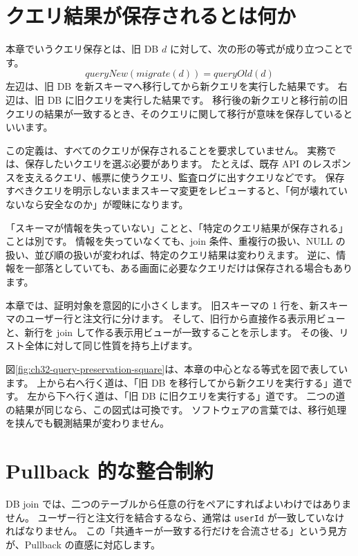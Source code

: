 \section{クエリ結果が保存されるとは何か}

本章でいうクエリ保存とは、旧 DB \(d\) に対して、次の形の等式が成り立つことです。
\[
  \mathit{queryNew}(\mathit{migrate}(d)) = \mathit{queryOld}(d)
\]
左辺は、旧 DB を新スキーマへ移行してから新クエリを実行した結果です。
右辺は、旧 DB に旧クエリを実行した結果です。
移行後の新クエリと移行前の旧クエリの結果が一致するとき、そのクエリに関して移行が意味を保存しているといいます。

この定義は、すべてのクエリが保存されることを要求していません。
実務では、保存したいクエリを選ぶ必要があります。
たとえば、既存 API のレスポンスを支えるクエリ、帳票に使うクエリ、監査ログに出すクエリなどです。
保存すべきクエリを明示しないままスキーマ変更をレビューすると、「何が壊れていないなら安全なのか」が曖昧になります。

「スキーマが情報を失っていない」ことと、「特定のクエリ結果が保存される」ことは別です。
情報を失っていなくても、join 条件、重複行の扱い、NULL の扱い、並び順の扱いが変われば、特定のクエリ結果は変わりえます。
逆に、情報を一部落としていても、ある画面に必要なクエリだけは保存される場合もあります。

本章では、証明対象を意図的に小さくします。
旧スキーマの 1 行を、新スキーマのユーザー行と注文行に分けます。
そして、旧行から直接作る表示用ビューと、新行を join して作る表示用ビューが一致することを示します。
その後、リスト全体に対して同じ性質を持ち上げます。


図\ref{fig:ch32-query-preservation-square}は、本章の中心となる等式を図で表しています。
上から右へ行く道は、「旧 DB を移行してから新クエリを実行する」道です。
左から下へ行く道は、「旧 DB に旧クエリを実行する」道です。
二つの道の結果が同じなら、この図式は可換です。
ソフトウェアの言葉では、移行処理を挟んでも観測結果が変わりません。

\section{Pullback 的な整合制約}

DB join では、二つのテーブルから任意の行をペアにすればよいわけではありません。
ユーザー行と注文行を結合するなら、通常は \texttt{userId} が一致していなければなりません。
この「共通キーが一致する行だけを合流させる」という見方が、Pullback の直感に対応します。


